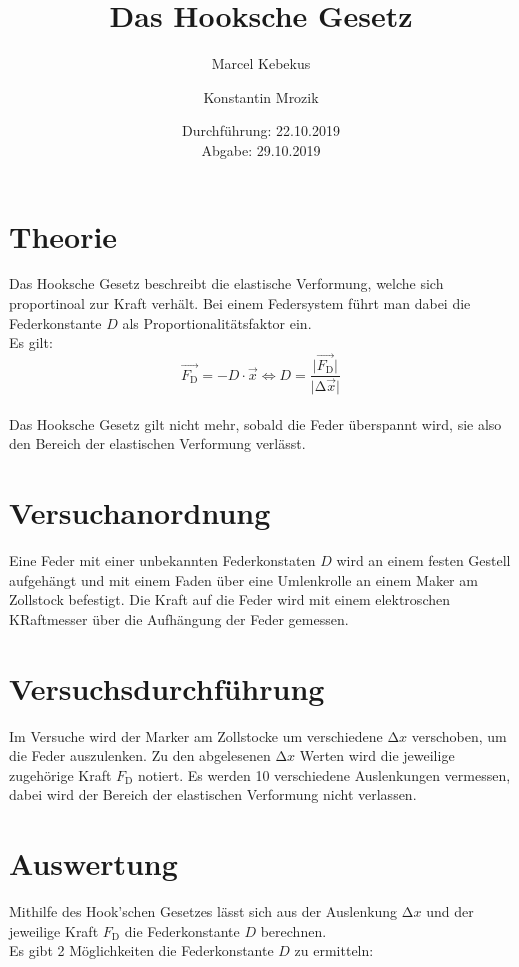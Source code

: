 \documentclass[titlepage = firstcover]{scrartcl}
\title{Das Hooksche Gesetz}
\author{Marcel Kebekus \and Konstantin Mrozik}
\date{%
  Durchführung: 22.10.2019 \\
  Abgabe: 29.10.2019
  }
\begin{document}
\maketitle
\thispagestyle{empty}
\tableofcontents
\clearpage
\setcounter{page}{1}

\newpage

\section{Theorie}
\label{sec:Theorie}
Das Hooksche Gesetz beschreibt die elastische Verformung, welche sich
proportinoal zur Kraft verhält.
Bei einem Federsystem führt man dabei die Federkonstante $D$ als Proportionalitätsfaktor ein.\\
Es gilt:
\\
\begin{equation}
  \vec{F_{\text{D}}}=-D \cdot \vec{x} \iff D=\frac{\lvert\vec{F_{\text{D}}}\rvert}{\lvert\increment\vec{x}\rvert}
  \label{eqn:Formel}
\end{equation}
\\
Das Hooksche Gesetz gilt nicht mehr, sobald die Feder überspannt wird, sie also den Bereich der
elastischen Verformung verlässt.


\section{Versuchanordnung}
\label{sec:Versuchsanordnung}
Eine Feder mit einer unbekannten Federkonstaten $D$ wird an einem festen Gestell aufgehängt
und mit einem Faden über eine Umlenkrolle an einem Maker am Zollstock befestigt. 
Die Kraft auf die Feder wird mit einem elektroschen KRaftmesser über die Aufhängung der Feder gemessen.


\section{Versuchsdurchführung}
\label{sec:Versuchsdurchführung}
Im Versuche wird der Marker am Zollstocke um verschiedene $\increment x$ verschoben, um die Feder
auszulenken.
Zu den abgelesenen $\increment x$ Werten wird die jeweilige zugehörige Kraft $F_{\text{D}}$ notiert.
Es werden 10 verschiedene Auslenkungen vermessen, dabei wird der Bereich der elastischen Verformung nicht verlassen.

\newpage

\section{Auswertung}
\label{sec:Auswertung}
Mithilfe des Hook'schen Gesetzes lässt sich aus der Auslenkung $\increment x$ und der jeweilige
Kraft $F_{\text{D}}$ die Federkonstante $D$ berechnen.\\
Es gibt 2 Möglichkeiten die Federkonstante $D$ zu ermitteln:
\end{document}
